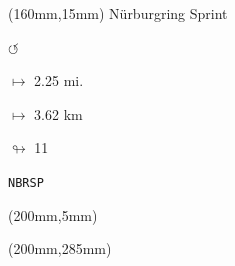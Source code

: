 \begin{textblock*}{40mm}(160mm,15mm)%
Nürburgring Sprint
\par \Huge$\circlearrowleft$
\Large
\par$\mapsto$ 2.25 mi.
\par$\mapsto$ 3.62 km
\par$\looparrowright$ 11
\par\hfill\tiny\tt NBRSP\\
\end{textblock*}
\begin{textblock*}{20mm}(200mm,5mm)%
\fbox{\thepage}
\end{textblock*}
\begin{textblock*}{20mm}(200mm,285mm)%
\fbox{\thepage}
\end{textblock*}
\null\newpage

